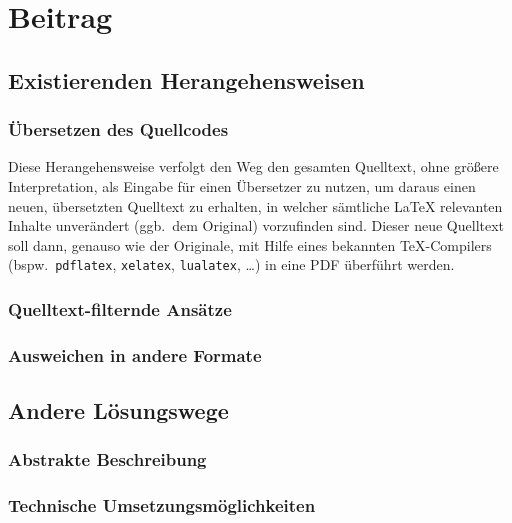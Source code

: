 \section{Beitrag}%
\subsection{Existierenden Herangehensweisen}%
\subsubsection{Übersetzen des Quellcodes}
Diese Herangehensweise verfolgt den Weg den gesamten Quelltext, ohne größere Interpretation, als Eingabe für einen Übersetzer zu nutzen, um daraus einen neuen, übersetzten Quelltext zu erhalten, in welcher sämtliche \LaTeX{} relevanten Inhalte unverändert (ggb.\ dem Original) vorzufinden sind. Dieser neue Quelltext soll dann, genauso wie der Originale, mit Hilfe eines bekannten \TeX{}-Compilers (bspw.\ \texttt{pdflatex}, \texttt{xelatex}, \texttt{lualatex}, \ldots) in eine PDF überführt werden.

\subsubsection{Quelltext-filternde Ansätze}%
\subsubsection{Ausweichen in andere Formate}
\subsubsection{}
\subsection{Andere Lösungswege}
\subsubsection{Abstrakte Beschreibung}%
\subsubsection{Technische Umsetzungsmöglichkeiten}
\subsection{}